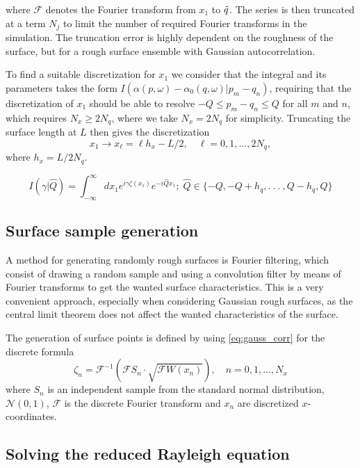 \documentclass[../main.tex]{subfiles}
\begin{document}
where $\mathcal{F}$ denotes the Fourier transform from $x_1$ to $\Tilde{q}$. The series is then truncated at a term $N_j$ to limit the number of required Fourier transforms in the simulation. The truncation error is highly dependent on the roughness of the surface, but for a rough surface ensemble with Gaussian autocorrelation.

To find a suitable discretization for $x_1$ we consider that the integral and its parameters takes the form $I(\alpha(p,\omega) - \alpha_0(q,\omega) | p_m - q_n)$, requiring that the discretization of $x_1$ should be able to resolve $-Q \leq p_m - q_n \leq Q$ for all $m$ and $n$, which requires $N_x \geq 2N_q$, where we take $N_x = 2N_q$ for simplicity. Truncating the surface length at $L$ then gives the discretization
\begin{equation}
    x_1 \longrightarrow x_\ell = \ell h_x - L/2,\quad \ell = 0,1,...,2N_q,
\end{equation}
where $h_x = L/2N_q$.

\begin{equation}
    I(\gamma|\hat{Q}) = \int_{-\infty}^{\infty} dx_1 e^{i\gamma\zeta(x_1)} e^{-i\hat{Q}x_1}; \; \hat{Q} \in \{-Q, -Q+h_q, .\: .\: .\: , Q-h_q,  Q \}
\end{equation}


\subsection{Surface sample generation}
A method for generating randomly rough surfaces is Fourier filtering, which consist of drawing a random sample and using a convolution filter by means of Fourier transforms to get the wanted surface characteristics. This is a very convenient approach, especially when considering Gaussian rough surfaces, as the central limit theorem does not affect the wanted characteristics of the surface.

The generation of surface points is defined by using \autoref{eq:gauss_corr} for the discrete formula
\begin{equation}
    \zeta_n = \mathcal{F}^{-1} \left(\mathcal{F} S_n \cdot \sqrt{\mathcal{F} W(x_n)}\right),\quad n = 0,1,...,N_x
\end{equation}
where $S_n$ is an independent sample from the standard normal distribution, $\mathcal{N}(0,1)$, $\mathcal{F}$ is the discrete Fourier transform and $x_n$ are discretized $x$-coordinates.



\subsection{Solving the reduced Rayleigh equation}
\end{document}
